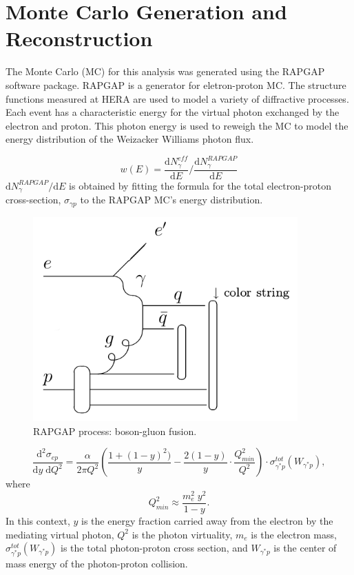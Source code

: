 
\chapter{Monte Carlo Generation and Reconstruction}

The Monte Carlo (MC) for this analysis was generated using the RAPGAP software package. RAPGAP is a generator for eletron-proton MC. The structure functions measured at HERA are used to model a variety of diffractive processes. Each event has a characteristic energy for the virtual photon exchanged by the electron and proton. This photon energy is used to reweigh the MC to model the energy distribution of the Weizacker Williams photon flux. 

\begin{equation}
w(E) = \frac{\mathrm{d} N^{eff}_\gamma}{\mathrm{d} E} / \frac{\mathrm{d} N^{RAPGAP}_\gamma }{\mathrm{d} E}
\end{equation}
$\mathrm{d} N^{RAPGAP}_\gamma / \mathrm{d} E$ is obtained by fitting the formula for the total electron-proton cross-section, $\sigma_{\gamma p}$ to the RAPGAP MC's energy distribution. 

\begin{figure}[h!]
\begin{centering}
\includegraphics[width=4in]{Appendix1/importfigs/rapgap_diagram.png}
\par\end{centering}
\caption{RAPGAP process: boson-gluon fusion. \label{fig:rapgap_diagram}}
\end{figure}

\begin{equation}
\frac{\mathrm{d}^2 \sigma_{ep} }{\mathrm{d} y \; \mathrm{d} Q^2} = \frac{\alpha}{2 \pi Q^2}\left ( \frac{1+(1-y)^2)}{y} - \frac{2(1-y)}{y}\cdot \frac{Q^2_{min}}{Q^2} \right )\cdot \sigma^{tot}_{\gamma^*p}(W_{\gamma^*p}),
\end{equation}
where 
\begin{equation}
Q^2_{min}\approx \frac{m_e^2 \; y^2}{1-y}.
\end{equation}
In this context, $y$ is the energy fraction carried away from the electron by the mediating virtual photon, $Q^2$ is the photon virtuality, $m_e$ is the electron mass, $\sigma^{tot}_{\gamma^*p}(W_{\gamma^*p})$ is the total photon-proton cross section, and $W_{\gamma^*p}$ is the center of mass energy of the photon-proton collision. 

